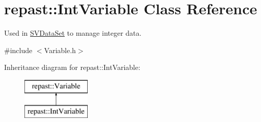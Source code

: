 \hypertarget{classrepast_1_1_int_variable}{\section{repast\-:\-:Int\-Variable Class Reference}
\label{classrepast_1_1_int_variable}
}


Used in \hyperlink{classrepast_1_1_s_v_data_set}{S\-V\-Data\-Set} to manage integer data.  




{\ttfamily \#include $<$Variable.\-h$>$}

Inheritance diagram for repast\-:\-:Int\-Variable\-:\begin{figure}[H]
\begin{center}
\leavevmode
\includegraphics[height=2.000000cm]{classrepast_1_1_int_variable}
\end{center}
\end{figure}
